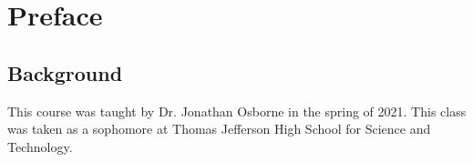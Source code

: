 \documentclass[../main.tex]{subfiles}
\begin{document}
\chapter{Preface}
\section{Background}
    This course was taught by Dr. Jonathan Osborne in the spring of 2021. This class was taken as a sophomore
    at Thomas Jefferson High School for Science and Technology.
\end{document}
